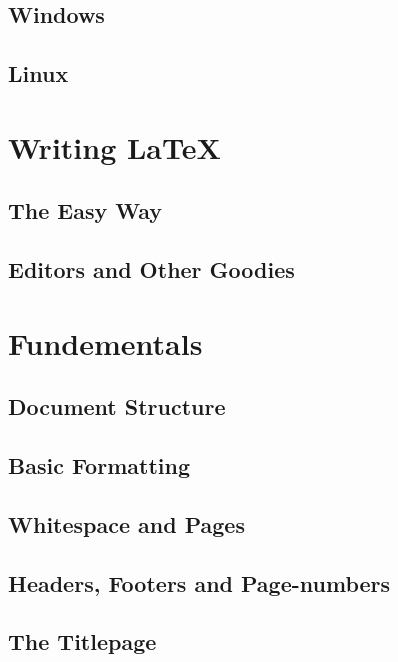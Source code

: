 \documentclass[12pt,a4paper]{article}
\begin{document}
\subsection{Windows}

\subsection{Linux}

\newpage
\section{Writing LaTeX}

\subsection{The Easy Way}

\subsection{Editors and Other Goodies}

\newpage
\section{Fundementals}

\subsection{Document Structure}


\subsection{Basic Formatting}

\subsection{Whitespace and Pages}


\subsection{Headers, Footers and Page-numbers}

\subsection{The Titlepage}
\end{document}
